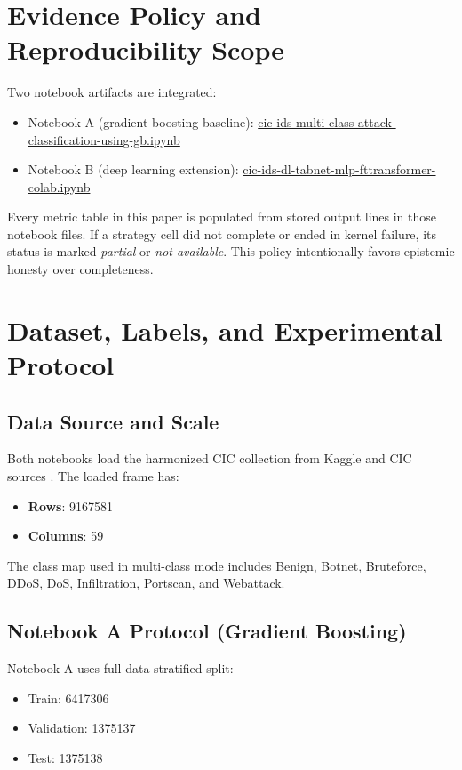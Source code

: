 \documentclass[10pt,journal]{IEEEtran}
\begin{document}
\section{Evidence Policy and Reproducibility Scope}
Two notebook artifacts are integrated:

\begin{itemize}
\item Notebook A (gradient boosting baseline): \url{cic-ids-multi-class-attack-classification-using-gb.ipynb}
\item Notebook B (deep learning extension): \url{cic-ids-dl-tabnet-mlp-fttransformer-colab.ipynb}
\end{itemize}

Every metric table in this paper is populated from stored output lines in those notebook files. If a strategy cell did not complete or ended in kernel failure, its status is marked \emph{partial} or \emph{not available}. This policy intentionally favors epistemic honesty over completeness.

\section{Dataset, Labels, and Experimental Protocol}
\subsection{Data Source and Scale}
Both notebooks load the harmonized CIC collection from Kaggle and CIC sources \cite{kaggleciccollection,cicdatasets,sharafaldin2018toward}. The loaded frame has:

\begin{itemize}
\item \textbf{Rows}: \num{9167581}
\item \textbf{Columns}: 59
\end{itemize}

The class map used in multi-class mode includes Benign, Botnet, Bruteforce, DDoS, DoS, Infiltration, Portscan, and Webattack.

\subsection{Notebook A Protocol (Gradient Boosting)}
Notebook A uses full-data stratified split:

\begin{itemize}
\item Train: \num{6417306}
\item Validation: \num{1375137}
\item Test: \num{1375138}
\end{itemize}
\end{document}
